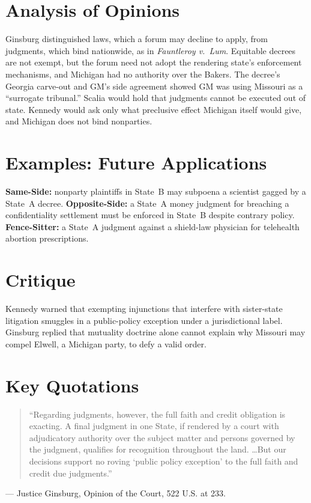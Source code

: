 \documentclass[12pt]{article}
\begin{document}
\section{Analysis of Opinions}
Ginsburg distinguished laws, which a forum may decline to apply, from judgments, which bind nationwide, as in \textit{Fauntleroy v.\ Lum}. Equitable decrees are not exempt, but the forum need not adopt the rendering state's enforcement mechanisms, and Michigan had no authority over the Bakers. The decree's Georgia carve-out and GM's side agreement showed GM was using Missouri as a ``surrogate tribunal.'' Scalia would hold that judgments cannot be executed out of state. Kennedy would ask only what preclusive effect Michigan itself would give, and Michigan does not bind nonparties.

\section{Examples: Future Applications}
\textbf{Same-Side:} nonparty plaintiffs in State~B may subpoena a scientist gagged by a State~A decree. \textbf{Opposite-Side:} a State~A money judgment for breaching a confidentiality settlement must be enforced in State~B despite contrary policy. \textbf{Fence-Sitter:} a State~A judgment against a shield-law physician for telehealth abortion prescriptions.

\section{Critique}
Kennedy warned that exempting injunctions that interfere with sister-state litigation smuggles in a public-policy exception under a jurisdictional label. Ginsburg replied that mutuality doctrine alone cannot explain why Missouri may compel Elwell, a Michigan party, to defy a valid order.

\section{Key Quotations}
\begin{quote}
``Regarding judgments, however, the full faith and credit obligation is exacting. A final judgment in one State, if rendered by a court with adjudicatory authority over the subject matter and persons governed by the judgment, qualifies for recognition throughout the land. \ldots But our decisions support no roving `public policy exception' to the full faith and credit due judgments.''
\end{quote}
\noindent --- Justice Ginsburg, Opinion of the Court, 522 U.S. at 233.
\end{document}
